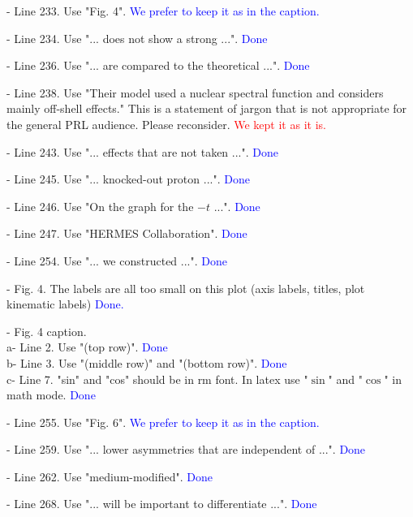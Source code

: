\documentclass[a4paper,11pt,twoside]{article}
\begin{document}
\begin{enumerate}
- Line 233. Use "Fig. 4".
      \textcolor{blue}{We prefer to keep it as in the caption.}

- Line 234. Use "... does not show a strong ...".
      \textcolor{blue}{Done}

- Line 236. Use "... are compared to the theoretical ...".
      \textcolor{blue}{Done}

- Line 238. Use "Their model used a nuclear spectral function and considers 
   mainly off-shell effects." This is a statement of jargon that is not 
   appropriate for the general PRL audience.  Please reconsider.
      \textcolor{red}{We kept it as it is.}

- Line 243. Use "... effects that are not taken ...".
      \textcolor{blue}{Done}

- Line 245. Use "... knocked-out proton ...".
      \textcolor{blue}{Done}

- Line 246. Use "On the graph for the $-t$ ...".
      \textcolor{blue}{Done}

- Line 247. Use "HERMES Collaboration".
      \textcolor{blue}{Done}

- Line 254. Use "... we constructed ...".
      \textcolor{blue}{Done}

- Fig. 4. The labels are all too small on this plot (axis labels, titles, plot 
  kinematic labels)
      \textcolor{blue}{Done.}

- Fig. 4 caption.\\
   a- Line 2. Use "(top row)".
      \textcolor{blue}{Done}\\
   b- Line 3. Use "(middle row)" and "(bottom row)".
      \textcolor{blue}{Done}\\
   c- Line 7. "sin" and "cos" should be in rm font. In latex use "$\sin$" and 
   "$\cos$" in math mode.
      \textcolor{blue}{Done}

- Line 255. Use "Fig. 6".
      \textcolor{blue}{We prefer to keep it as in the caption.}

- Line 259. Use "... lower asymmetries that are independent of ...".
      \textcolor{blue}{Done}

- Line 262. Use "medium-modified".
      \textcolor{blue}{Done}

- Line 268. Use "... will be important to differentiate ...".
      \textcolor{blue}{Done}


\end{enumerate}
\end{document}
